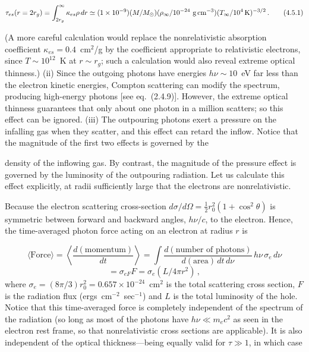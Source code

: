 \documentclass[aps,prd,twocolumn,superscriptaddress,nofootinbib]{revtex4-2}
\begin{document}
\begin{equation}
\tau_{es}(r = 2r_g) = \int_{2r_g}^{\infty} \kappa_{es} \rho\, dr
\simeq (1 \times 10^{-9})(M/M_\odot)(\rho_\infty/10^{-24}~\text{g\,cm}^{-3})(T_\infty/10^4\,\text{K})^{-3/2}\,.
\tag{4.5.1}
\end{equation}

(A more careful calculation would replace the nonrelativistic absorption
coefficient $\kappa_{es} = 0.4$~cm$^2$/g by the coefficient appropriate to relativistic
electrons, since $T \sim 10^{12}$~K at $r \sim r_g$; such a calculation would also reveal
extreme optical thinness.)  (ii) Since the outgoing photons have energies
$h\nu \sim 10$~eV far less than the electron kinetic energies, Compton scattering can
modify the spectrum, producing high-energy photons [see eq.\ (2.4.9)].  However,
the extreme optical thinness guarantees that only about one photon in a million
scatters; so this effect can be ignored.  (iii) The outpouring photons exert a
pressure on the infalling gas when they scatter, and this effect can retard the
inflow.  Notice that the magnitude of the first two effects is governed by the

\bigskip

density of the inflowing gas.  By contrast, the magnitude of the pressure effect
is governed by the luminosity of the outpouring radiation.  Let us calculate this
effect explicitly, at radii sufficiently large that the electrons are nonrelativistic.

Because the electron scattering cross-section $d\sigma/d\Omega = \tfrac{1}{2}r_0^2(1+\cos^2\theta)$ is
symmetric between forward and backward angles, $h\nu/c$, to the electron.  Hence, the time-averaged
photon force acting on an electron at radius $r$ is

\begin{equation}
\langle\text{Force}\rangle = \left\langle\frac{d(\text{momentum})}{dt}\right\rangle
= \int \frac{d(\text{number of photons})}{d(\text{area})\,dt\,d\nu}\, h\nu\,\sigma_e\, d\nu
\tag{4.5.2}
\end{equation}
%
\[
= \sigma_{eF} F = \sigma_e (L/4\pi r^2)\,,
\]
%
where $\sigma_e = (8\pi/3)r_0^2 = 0.657 \times 10^{-24}$~cm$^2$ is the total scattering cross section,
$F$ is the radiation flux (ergs~cm$^{-2}$~sec$^{-1}$) and $L$ is the total luminosity of the hole.
Notice that this time-averaged force is completely independent of the spectrum
of the radiation (so long as most of the photons have $h\nu \ll m_e c^2$ as seen in the
electron rest frame, so that nonrelativistic cross sections are applicable).  It is
also independent of the optical thickness---being equally valid for $\tau \gg 1$, in
which case
\end{document}
